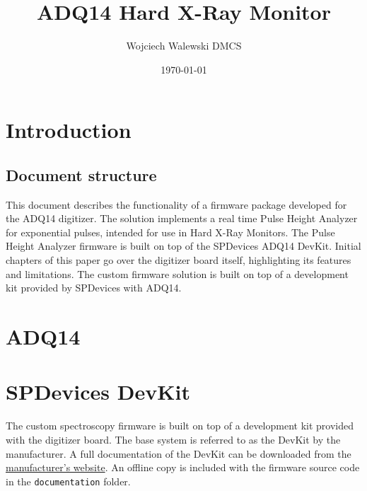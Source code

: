 \documentclass[12pt]{article}
\title{ADQ14 Hard X-Ray Monitor}
\author{Wojciech Walewski \newline DMCS}
\date{\today}
\begin{document}
\maketitle

\tableofcontents
\clearpage

\section{Introduction}

	\subsection{Document structure}
	This document describes the functionality of a firmware package developed for the ADQ14 digitizer.
	The solution implements a real time Pulse Height Analyzer for exponential pulses, 
	intended for use in Hard X-Ray Monitors. 
	The Pulse Height Analyzer firmware is built on top of the SPDevices ADQ14 DevKit.
	Initial chapters of this paper go over the digitizer board itself, 
	highlighting its features and limitations.
	The custom firmware solution is built on top of a development kit provided by SPDevices with ADQ14.
	\newpage
\section{ADQ14}
	\subsection{}

\section{SPDevices DevKit}
	The custom spectroscopy firmware is built on top of a development kit provided with the digitizer board.
	The base system is referred to as the DevKit by the manufacturer. 
	A full documentation of the DevKit can be downloaded from the 
	\href{https://www.spdevices.com/documents/user-guides/24-adq14-development-kit}{manufacturer's website}.
	An offline copy is included with the firmware source code in the \verb|documentation| folder.
\end{document}

